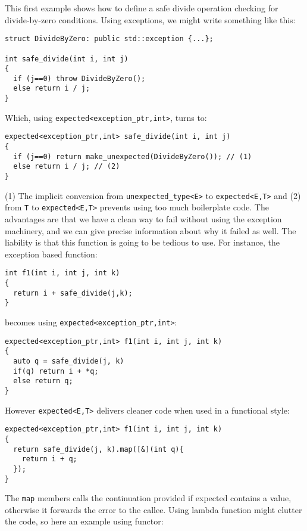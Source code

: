 \documentclass[a4paper,10pt]{article}
\newcommand{\cpp}[1]{\lstinline{#1}}
\begin{document}
This first example shows how to define a safe divide operation checking for divide-by-zero conditions. Using exceptions, we might write something like this:

\begin{lstlisting}
struct DivideByZero: public std::exception {...};

int safe_divide(int i, int j)
{
  if (j==0) throw DivideByZero();
  else return i / j;
}
\end{lstlisting}

\noindent
Which, using \cpp{expected<exception_ptr,int>}, turns to:

\begin{lstlisting}
expected<exception_ptr,int> safe_divide(int i, int j)
{
  if (j==0) return make_unexpected(DivideByZero()); // (1)
  else return i / j; // (2)
}
\end{lstlisting}

(1) The implicit conversion from \cpp{unexpected_type<E>} to \cpp{expected<E,T>} and (2) from \cpp{T} to \cpp{expected<E,T>} prevents using too much boilerplate code. The advantages are that we have a clean way to fail without using the exception machinery, and we can give precise information about why it failed as well. The liability is that this function is going to be tedious to use. For instance, the exception based function:

\begin{lstlisting}
int f1(int i, int j, int k)
{
  return i + safe_divide(j,k);
}
\end{lstlisting}

\noindent
becomes using \texttt{expected<exception_ptr,int>}:

\begin{lstlisting}
expected<exception_ptr,int> f1(int i, int j, int k)
{
  auto q = safe_divide(j, k)
  if(q) return i + *q;
  else return q;
}
\end{lstlisting}

\noindent
However \cpp{expected<E,T>} delivers cleaner code when used in a functional style:

\begin{lstlisting}
expected<exception_ptr,int> f1(int i, int j, int k)
{
  return safe_divide(j, k).map([&](int q){
    return i + q;
  });
}
\end{lstlisting}

The \cpp{map} members calls the continuation provided if expected contains a value, otherwise it forwards the error to the callee. Using lambda function might clutter the code, so here an example using functor:
\end{document}
